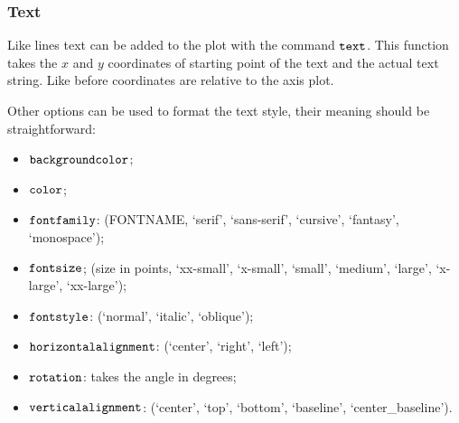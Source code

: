 \subsubsection{Text}\label{text}

Like lines text can be added to the plot with the command \(\tt{text}\).
This function takes the \(x\) and \(y\) coordinates of starting point of
the text and the actual text string. Like before coordinates are
relative to the axis plot.

Other options can be used to format the text style, their meaning should
be straightforward:

\begin{itemize}
	\tightlist
	\item
	\(\tt{backgroundcolor}\);
	\item
	\(\tt{color}\);
	\item
	\(\tt{fontfamily}\): (FONTNAME, `serif', `sans-serif', `cursive',
	`fantasy', `monospace');
	\item
	\(\tt{fontsize}\); (size in points, `xx-small', `x-small', `small',
	`medium', `large', `x-large', `xx-large');
	\item
	\(\tt{fontstyle}\): (`normal', `italic', `oblique');
	\item
	\(\tt{horizontalalignment}\): (`center', `right', `left');
	\item
	\(\tt{rotation}\): takes the angle in degrees;
	\item
	\(\tt{verticalalignment}\): (`center', `top', `bottom', `baseline',
	`center\_baseline').
\end{itemize}

